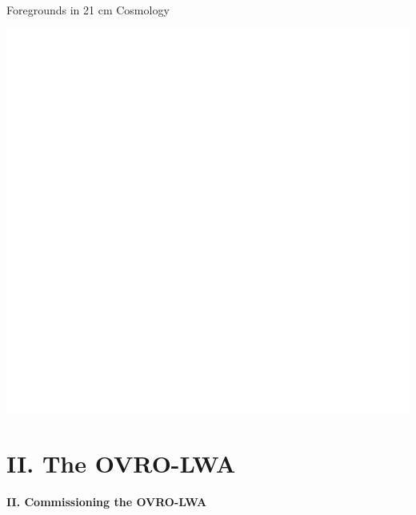 \documentclass{beamer}
\begin{document}
\begin{frame}{Foregrounds in 21 cm Cosmology}
    \begin{center}
        \includegraphics[height=0.75\textheight]{figures/foregrounds}
    \end{center}
\end{frame}


\section{II. The OVRO-LWA}

{
    \begin{frame}[t]

        {\large \bfseries II. Commissioning the OVRO-LWA}
    \end{frame}
}
\end{document}

